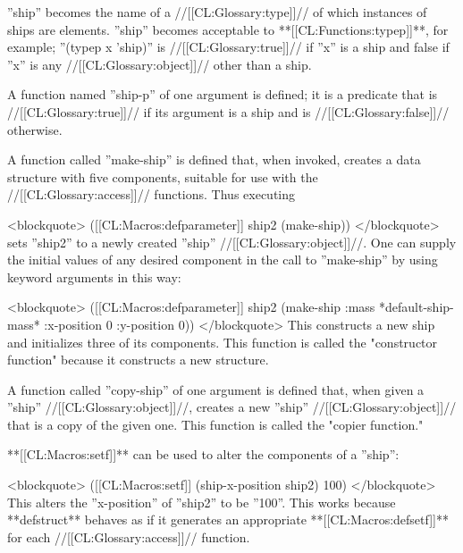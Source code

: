  ''ship'' becomes the name of a //[[CL:Glossary:type]]// of which instances of ships are elements. ''ship'' becomes acceptable to **[[CL:Functions:typep]]**, for example; ''(typep x 'ship)'' is //[[CL:Glossary:true]]// if ''x'' is a ship and false if ''x'' is any //[[CL:Glossary:object]]// other than a ship.

 A function named ''ship-p'' of one argument is defined; it is a predicate that is //[[CL:Glossary:true]]// if its argument is a ship and is //[[CL:Glossary:false]]// otherwise.

 A function called ''make-ship'' is defined that, when invoked, creates a data structure with five components, suitable for use with the //[[CL:Glossary:access]]// functions. Thus executing

<blockquote> ([[CL:Macros:defparameter]] ship2 (make-ship)) </blockquote> sets ''ship2'' to a newly created ''ship'' //[[CL:Glossary:object]]//. One can supply the initial values of any desired component in the call to ''make-ship'' by using keyword arguments in this way:

<blockquote> ([[CL:Macros:defparameter]] ship2 (make-ship :mass *default-ship-mass* :x-position 0 :y-position 0)) </blockquote> This constructs a new ship and initializes three of its components. This function is called the "constructor function" because it constructs a new structure.

 A function called ''copy-ship'' of one argument is defined that, when given a ''ship'' //[[CL:Glossary:object]]//, creates a new ''ship'' //[[CL:Glossary:object]]// that is a copy of the given one. This function is called the "copier function." \endlist

**[[CL:Macros:setf]]** can be used to alter the components of a ''ship'':

<blockquote> ([[CL:Macros:setf]] (ship-x-position ship2) 100) </blockquote> This alters the ''x-position'' of ''ship2'' to be ''100''. This works because **defstruct** behaves as if it generates an appropriate **[[CL:Macros:defsetf]]** for each //[[CL:Glossary:access]]// function.

